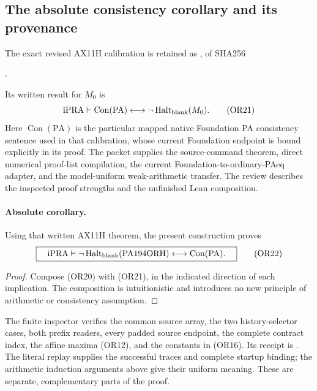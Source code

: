\subsection{The absolute consistency corollary and its provenance}

The exact revised AX11H calibration is retained as
, of SHA256
\begin{center}\footnotesize
{}.
\end{center}
Its written result for $M_0$ is
\[
 \mathrm{iPRA}\vdash
 \operatorname{Con}(\mathrm{PA})
   \longleftrightarrow\neg\operatorname{Halt}_{\rm blank}(M_0).
 \tag{OR21}
\]
Here $\operatorname{Con}(\mathrm{PA})$ is the particular mapped native
Foundation PA consistency sentence used in that calibration, whose
current Foundation endpoint is bound explicitly in its proof.
The packet supplies the source-command theorem, direct numerical
proof-list compilation, the current Foundation-to-ordinary-PAeq
adapter, and the model-uniform weak-arithmetic transfer.  The review
 describes the inspected
proof strengths and the unfinished Lean composition.

\paragraph{Absolute corollary.}
Using that written AX11H theorem, the present construction proves
\[
 \boxed{\quad\mathrm{iPRA}\vdash
 \neg\operatorname{Halt}_{\rm blank}(\mathrm{PA194ORH})
   \longleftrightarrow\operatorname{Con}(\mathrm{PA}).\quad}
 \tag{OR22}
\]
\begin{proof}
Compose (OR20) with (OR21), in the indicated direction of each
implication.  The composition is intuitionistic and introduces no
new principle of arithmetic or consistency assumption.
\end{proof}

The finite inspector  verifies the
common source array, the two history-selector cases, both prefix
readers, every padded source endpoint, the complete contract index,
the affine maxima (OR12), and the constants in (OR16).  Its receipt
is .  The literal replay supplies
the successful traces and complete startup binding; the arithmetic
induction arguments above give their uniform meaning.  These are
separate, complementary parts of the proof.
